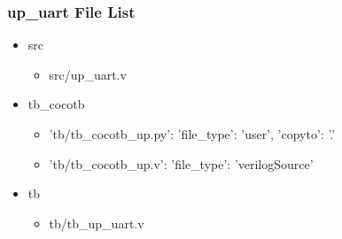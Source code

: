 \subsubsection{up\_uart File List}
\begin{itemize}
\item src
	\begin{itemize}
	\item src/up\_uart.v
	\end{itemize}
\item tb\_cocotb
	\begin{itemize}
	\item {'tb/tb\_cocotb\_up.py': {'file\_type': 'user', 'copyto': '.'}}
	\item {'tb/tb\_cocotb\_up.v': {'file\_type': 'verilogSource'}}
	\end{itemize}
\item tb
	\begin{itemize}
	\item tb/tb\_up\_uart.v
	\end{itemize}
\end{itemize}
